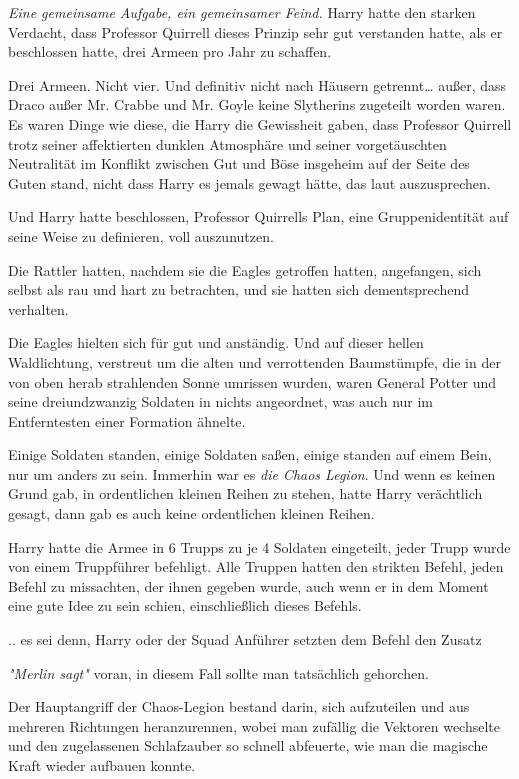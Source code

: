 {\emph{Eine gemeinsame Aufgabe, ein gemeinsamer Feind.} Harry hatte den starken Verdacht, dass Professor Quirrell dieses Prinzip sehr gut verstanden hatte, als er beschlossen hatte, drei Armeen pro Jahr zu schaffen.

Drei Armeen. Nicht vier. Und definitiv nicht nach Häusern getrennt… außer, dass Draco außer Mr. Crabbe und Mr. Goyle keine Slytherins zugeteilt worden waren. Es waren Dinge wie diese, die Harry die Gewissheit gaben, dass Professor Quirrell trotz seiner affektierten dunklen Atmosphäre und seiner vorgetäuschten Neutralität im Konflikt zwischen Gut und Böse insgeheim auf der Seite des Guten stand, nicht dass Harry es jemals gewagt hätte, das laut auszusprechen.

Und Harry hatte beschlossen, Professor Quirrells Plan, eine Gruppenidentität auf seine Weise zu definieren, voll auszunutzen.

Die Rattler hatten, nachdem sie die Eagles getroffen hatten, angefangen, sich selbst als rau und hart zu betrachten, und sie hatten sich dementsprechend verhalten.

Die Eagles hielten sich für gut und anständig. Und auf dieser hellen Waldlichtung, verstreut um die alten und verrottenden Baumstümpfe, die in der von oben herab strahlenden Sonne umrissen wurden, waren General Potter und seine dreiundzwanzig Soldaten in nichts angeordnet, was auch nur im Entferntesten einer Formation ähnelte.

Einige Soldaten standen, einige Soldaten saßen, einige standen auf einem Bein, nur um anders zu sein. Immerhin war es \emph{die Chaos Legion}. Und wenn es keinen Grund gab, in ordentlichen kleinen Reihen zu stehen, hatte Harry verächtlich gesagt, dann gab es auch keine ordentlichen kleinen Reihen.

Harry hatte die Armee in 6 Trupps zu je 4 Soldaten eingeteilt, jeder Trupp wurde von einem Truppführer befehligt. Alle Truppen hatten den strikten Befehl, jeden Befehl zu missachten, der ihnen gegeben wurde, auch wenn er in dem Moment eine gute Idee zu sein schien, einschließlich dieses Befehls.

.. es sei denn, Harry oder der Squad Anführer setzten dem Befehl den Zusatz

\emph{"Merlin sagt"} voran, in diesem Fall sollte man tatsächlich gehorchen.

Der Hauptangriff der Chaos-Legion bestand darin, sich aufzuteilen und aus mehreren Richtungen heranzurennen, wobei man zufällig die Vektoren wechselte und den zugelassenen Schlafzauber so schnell abfeuerte, wie man die magische Kraft wieder aufbauen konnte.

}
